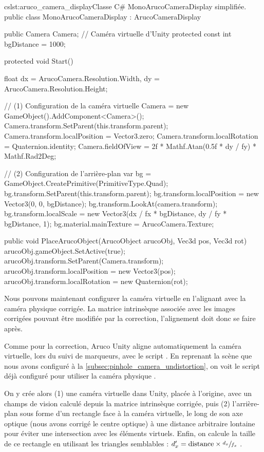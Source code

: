 \begin{listingETS}{cs}{lst:aruco_camera_display}{Classe C\# MonoArucoCameraDisplay simplifiée.}
  public class MonoArucoCameraDisplay : ArucoCameraDisplay
  {
    public Camera Camera; // Caméra virtuelle d'Unity
    protected const int bgDistance = 1000;

    protected void Start()
    {
      float dx = ArucoCamera.Resolution.Width,
        dy = ArucoCamera.Resolution.Height;

      // (1) Configuration de la caméra virtuelle
      Camera = new GameObject().AddComponent<Camera>();
      Camera.transform.SetParent(this.transform.parent);
      Camera.transform.localPosition = Vector3.zero;
      Camera.transform.localRotation = Quaternion.identity;
      Camera.fieldOfView = 2f * Mathf.Atan(0.5f * dy / fy) * Mathf.Rad2Deg;

      // (2) Configuration de l'arrière-plan
      var bg = GameObject.CreatePrimitive(PrimitiveType.Quad);
      bg.transform.SetParent(this.transform.parent);
      bg.transform.localPosition = new Vector3(0, 0, bgDistance);
      bg.transform.LookAt(camera.transform);
      bg.transform.localScale = new Vector3(dx / fx * bgDistance,
        dy / fy * bgDistance, 1);
      bg.material.mainTexture = ArucoCamera.Texture;
    }

    public void PlaceArucoObject(ArucoObject arucoObj, Vec3d pos, Vec3d rot)
    {
      arucoObj.gameObject.SetActive(true);
      arucoObj.transform.SetParent(Camera.transform);
      arucoObj.transform.localPosition = new Vector3(pos);
      arucoObj.transform.localRotation = new Quaternion(rot);
    }
  }
\end{listingETS}

Nous pouvons maintenant configurer la caméra virtuelle en l'alignant avec la caméra physique corrigée. La matrice intrinsèque associée avec les images corrigées pouvant être modifiée par la correction, l'alignement doit donc se faire après.

Comme pour la correction, Aruco Unity aligne automatiquement la caméra virtuelle, lors du suivi de marqueurs, avec le script  . En reprenant la scène que nous avons configuré à la \autoref{subsec:pinhole_camera_undistortion}, on voit le script déjà configuré pour utiliser la caméra physique .

On y crée alors (1) une caméra virtuelle dans Unity, placée à l'origine, avec un champs de vision calculé  depuis la matrice intrinsèque corrigée, puis (2) l'arrière-plan sous forme d'un rectangle face à la caméra virtuelle, le long de son axe optique (nous avons corrigé le centre optique) à une distance arbitraire lontaine pour éviter une intersection avec les éléments virtuels. Enfin, on calcule la taille de ce rectangle en utilisant les triangles semblables : $d_x' = \text{distance} \times \sfrac{d_x}{f_x}$ .

